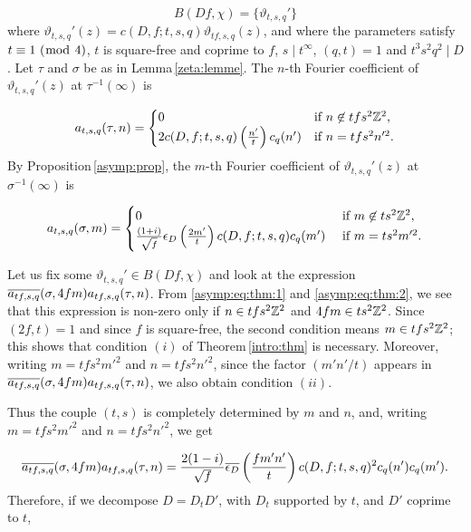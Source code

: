 \documentclass[leqno,10pt]{amsart}
\theoremstyle{plain}
\numberwithin{equation}{section}
\theoremstyle{definition}
\theoremstyle{remark}
\begin{document}
\begin{equation*}
B(Df,\chi) = \{\vartheta_{t,s,q}'\}
\end{equation*}
where $\vartheta_{t,s,q}'(z)= c(D,f;t,s,q) \vartheta_{tf,s,q}(z)$, and where the parameters satisfy $t\equiv 1 \ (\bmod\  4)$, $t$ is square-free and coprime to $f$, $s\mid t^\infty$, $(q,t)=1$ and $t^3s^2q^2 \mid D$.
Let $\tau$ and $\sigma$ be as in Lemma\,\ref{zeta:lemme}. The $n$-th Fourier coefficient of $\vartheta_{t,s,q}'(z)$ at $\tau^{-1}(\infty)$ is 

\begin{equation}\label{asymp:eq:thm:1}
a_{t,s,q}(\tau,n)=\begin{cases} 0&\textnormal{if $n\not\in tfs^2 \mathbb{Z}^2$},\\
2 c(D,f;t,s,q) \left(\frac{n'}{t}\right) c_q(n')&\textnormal{if $n=tfs^2n'^2$}.
\end{cases}
\end{equation}
By Proposition\,\ref{asymp:prop}, the $m$-th Fourier coefficient of $\vartheta_{t,s,q}'(z)$ at $\sigma^{-1}(\infty)$ is 

\begin{equation}\label{asymp:eq:thm:2}
a_{t,s,q}(\sigma,m) =\begin{cases}
0 &\textnormal{ if $m \not\in ts^2 \mathbb{Z}^2$},\\
\frac{(1+i)}{\sqrt{f}} \epsilon_D \left(\frac{2m'}{t}\right) c(D,f;t,s,q)
c_q(m') &\textnormal{ if } m= ts^2m'^2.
\end{cases}
\end{equation}

Let us fix some $\vartheta_{t,s,q}'\in B(Df,\chi)$ and look at the expression $\overline{a_{tf,s,q}}(\sigma,4fm) a_{tf,s,q}(\tau,n)$. From \eqref{asymp:eq:thm:1} and  \eqref{asymp:eq:thm:2}, we see that this expression is non-zero only if $n\in tfs^2\mathbb{Z}^2$ and $4fm\in t s^2 \mathbb{Z}^2$. Since $(2f,t)=1$ and since $f$ is square-free, the second condition means $m\in tfs^2\mathbb{Z}^2$; this shows that condition $(i)$ of Theorem\,\ref{intro:thm} is necessary. Moreover, writing $m=tfs^2m'^2$ and $n=tfs^2n'^2$, since the factor $(m'n'/t)$ appears in $\overline{a_{tf,s,q}}(\sigma,4fm) a_{tf,s,q}(\tau,n)$, we also obtain condition $(ii)$.  

Thus the couple $(t,s)$ is completely determined by $m$ and $n$, and, writing $m=tfs^2m'^2$ and $n=tfs^2n'^2$, we get 

\begin{equation*}
\overline{a_{tf,s,q}}(\sigma,4fm) a_{tf,s,q}(\tau,n)
= \frac{2(1-i)}{\sqrt{f}} \overline{\epsilon_D} \left(\frac{fm'n'}{t}\right) c(D,f;t,s,q)^2 c_q(n') c_q(m').
\end{equation*}
Therefore, if we decompose $D=D_tD'$, with $D_t$ supported by $t$, and $D'$ coprime to $t$,
\end{document}
